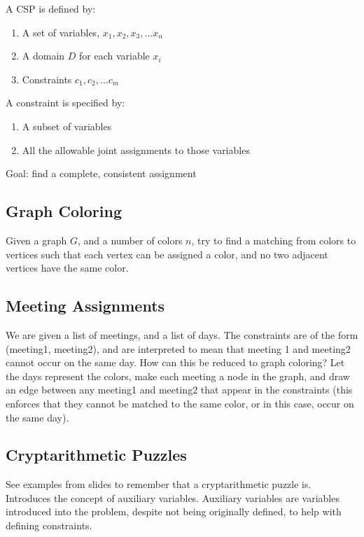 \documentclass[letterpaper]{article} %
\begin{document}
A CSP is defined by:

\begin{enumerate}
	\item A set of variables, $x_1,x_2,x_3,...x_n$
	\item A domain $D$ for each variable $x_i$
	\item Constraints $c_1,c_2,...c_m$
\end{enumerate}

A constraint is specified by:

\begin{enumerate}
	\item A subset of variables
	\item All the allowable joint assignments to those variables
\end{enumerate}

Goal: find a complete, consistent assignment

\subsection{Graph Coloring}

Given a graph $G$, and a number of colors $n$, try to find a matching from colors to vertices such that each vertex can be assigned a color, and no two adjacent vertices have the same color.

\subsection{Meeting Assignments}

We are given a list of meetings, and a list of days. The constraints are of the form (meeting1, meeting2), and are interpreted to mean that meeting 1 and meeting2 cannot occur on the same day. How can this be reduced to graph coloring? Let the days represent the colors, make each meeting a node in the graph, and draw an edge between any meeting1 and meeting2 that appear in the constraints (this enforces that they cannot be matched to the same color, or in this case, occur on the same day).

\subsection{Cryptarithmetic Puzzles}

See examples from slides to remember that a cryptarithmetic puzzle is. Introduces the concept of auxiliary variables. Auxiliary variables are variables introduced into the problem, despite not being originally defined, to help with defining constraints.
\end{document}

